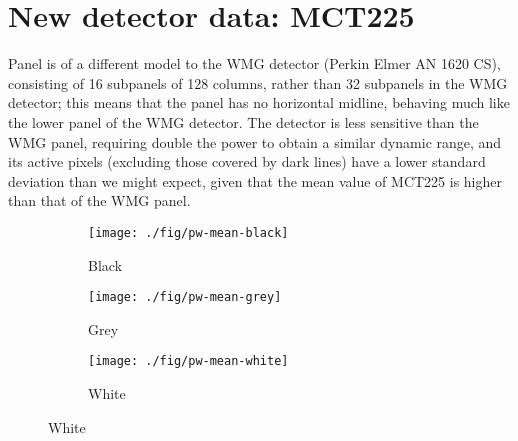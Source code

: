 \documentclass[10pt,fleqn]{article}
\begin{document}
\section{New detector data: MCT225}

Panel is of a different model to the WMG detector (Perkin Elmer AN 1620 CS), consisting of 16 subpanels of 128 columns, rather than 32 subpanels in the WMG detector; this means that the panel has no horizontal midline, behaving much like the lower panel of the WMG detector. The detector is less sensitive than the WMG panel, requiring double the power to obtain a similar dynamic range, and its active pixels (excluding those covered by dark lines) have a lower standard deviation than we might expect, given that the mean value of MCT225 is higher than that of the WMG panel.


\begin{figure}[!ht]
\caption{Images of pixelwise means from MCT225}
\centering

\begin{subfigure}[t]{0.32\textwidth}
\caption{Black}
\texttt{[image: ./fig/pw-mean-black]}
\end{subfigure}
%
\begin{subfigure}[t]{0.32\textwidth}
\caption{Grey}
\texttt{[image: ./fig/pw-mean-grey]}
\end{subfigure}
%
\begin{subfigure}[t]{0.32\textwidth}
\caption{White}
\texttt{[image: ./fig/pw-mean-white]}
\end{subfigure}
\end{figure}
\end{document}
